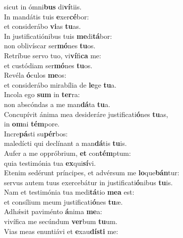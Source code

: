 \evenverse sicut in ómni\textbf{bus} di\textbf{ví}tiis.\\
\oddverse In mandátis tuis \textbf{e}xer\textbf{cé}bor:~\*\\
\oddverse et considerábo \textbf{vi}as \textbf{tu}as.\\
\evenverse In justificatiónibus tuis \textbf{me}di\textbf{tá}bor:~\*\\
\evenverse non oblivíscar ser\textbf{mó}nes \textbf{tu}os.\\
\oddverse Retríbue servo tuo, vi\textbf{ví}fi\textbf{ca} me:~\*\\
\oddverse et custódiam ser\textbf{mó}nes \textbf{tu}os.\\
\evenverse Revéla \textbf{ó}culos \textbf{me}os:~\*\\
\evenverse et considerábo mirabília de \textbf{le}ge \textbf{tu}a.\\
\oddverse Incola ego \textbf{sum} in \textbf{ter}ra:~\*\\
\oddverse non abscóndas a me man\textbf{dá}ta \textbf{tu}a.\\
\evenverse Concupívit ánima mea desideráre justificati\textbf{ó}nes \textbf{tu}as,~\*\\
\evenverse in \textbf{om}ni \textbf{tém}pore.\\
\oddverse Incre\textbf{pá}sti su\textbf{pér}bos:~\*\\
\oddverse maledícti qui declínant a man\textbf{dá}tis \textbf{tu}is.\\
\evenverse Aufer a me oppróbrium, \textbf{et} con\textbf{tém}ptum:~\*\\
\evenverse quia testimónia tua \textbf{ex}qui\textbf{sí}vi.\\
\oddverse Etenim sedérunt príncipes, et advérsum me \textbf{lo}que\textbf{bán}tur:~\*\\
\oddverse servus autem tuus exercebátur in justificati\textbf{ó}nibus \textbf{tu}is.\\
\evenverse Nam et testimónia tua medi\textbf{tá}tio \textbf{me}\textbf{a} est:~\*\\
\evenverse et consílium meum justificati\textbf{ó}nes \textbf{tu}æ.\\
\oddverse Adhǽsit paviménto \textbf{á}nima \textbf{me}a:~\*\\
\oddverse vivífica me secúndum \textbf{ver}bum \textbf{tu}um.\\
\evenverse Vias meas enuntiávi et \textbf{e}xau\textbf{dí}\textbf{sti} me:~\*\\
